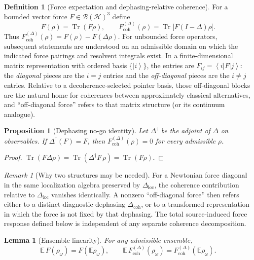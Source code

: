 \documentclass[11pt]{article}
\newtheorem{lemma}[theorem]{Lemma}
\newtheorem{proposition}[theorem]{Proposition}
\theoremstyle{definition}
\newtheorem{definition}[theorem]{Definition}
\theoremstyle{remark}
\newtheorem{remark}[theorem]{Remark}
\newcommand{\ket}[1]{\left|#1\right\rangle}
\newcommand{\bra}[1]{\left\langle#1\right|}
\newcommand{\Tr}{\operatorname{Tr}}
\begin{document}
\begin{definition}[Force expectation and dephasing-relative coherence]
For a bounded vector force $F\in\mathcal B(\mathcal H)^3$ define
\begin{equation}
  F(\rho)=\Tr(F\rho),\qquad
  F^{(\Delta)}_{\mathrm{coh}}(\rho)=\Tr\bigl[F(I-\Delta)\rho\bigr].
\end{equation}
Thus $F^{(\Delta)}_{\mathrm{coh}}(\rho)=F(\rho)-F(\Delta\rho)$.
For unbounded force operators, subsequent statements are understood on an admissible domain on which the indicated force pairings and resolvent integrals exist.
In a finite-dimensional matrix representation with ordered basis $\{\ket{i}\}$, the entries are $F_{ij}=\bra{i}F\ket{j}$: the \emph{diagonal} pieces are the $i=j$ entries and the \emph{off-diagonal} pieces are the $i\neq j$ entries.
Relative to a decoherence-selected pointer basis, those off-diagonal blocks are the natural home for coherences between approximately classical alternatives, and ``off-diagonal force'' refers to that matrix structure (or its continuum analogue).
\end{definition}

\begin{proposition}[Dephasing no-go identity]
Let $\Delta^\dagger$ be the adjoint of $\Delta$ on observables.
If $\Delta^\dagger(F)=F$, then $F^{(\Delta)}_{\mathrm{coh}}(\rho)=0$ for every admissible $\rho$.
\end{proposition}
\begin{proof}
$\Tr(F\Delta\rho)=\Tr(\Delta^\dagger F\,\rho)=\Tr(F\rho)$.
\end{proof}

\begin{remark}[Why two structures may be needed]
For a Newtonian force diagonal in the same localization algebra preserved by $\Delta_{\mathrm{loc}}$, the coherence contribution relative to $\Delta_{\mathrm{loc}}$ vanishes identically.
A nonzero ``off-diagonal force'' then refers either to a distinct diagnostic dephasing $\Delta_{\mathrm{coh}}$, or to a transformed representation in which the force is not fixed by that dephasing.
The total source-induced force response defined below is independent of any separate coherence decomposition.
\end{remark}

\begin{lemma}[Ensemble linearity]
For any admissible ensemble,
\begin{equation}
  \mathbb E\,F(\rho_\omega)=F(\mathbb E\rho_\omega),\qquad
  \mathbb E\,F^{(\Delta)}_{\mathrm{coh}}(\rho_\omega)=F^{(\Delta)}_{\mathrm{coh}}(\mathbb E\rho_\omega).
\end{equation}
\end{lemma}
\end{document}
